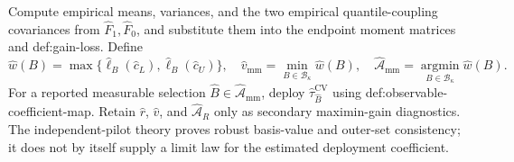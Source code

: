 Compute empirical means, variances, and the two empirical quantile-coupling covariances from \(\widehat F_1,\widehat F_0\), and substitute them into the endpoint moment matrices and def:gain-loss.  Define
\[
 \widehat w(B)=\max\{\widehat\ell_B(\widehat c_L),\widehat\ell_B(\widehat c_U)\},
 \quad
 \widehat v_{\mathrm{mm}}=\min_{B\in\mathcal B_\kappa}\widehat w(B),
 \quad
 \widehat{\mathcal A}_{\mathrm{mm}}=\operatorname*{argmin}_{B\in\mathcal B_\kappa}\widehat w(B).
\]
For a reported measurable selection \(\widehat B\in\widehat{\mathcal A}_{\mathrm{mm}}\), deploy \(\widehat\tau_{\widehat B}^{\mathrm{CV}}\) using def:observable-coefficient-map.  Retain \(\widehat r\), \(\widehat v\), and \(\widehat{\mathcal A}_R\) only as secondary maximin-gain diagnostics.  The independent-pilot theory proves robust basis-value and outer-set consistency; it does not by itself supply a limit law for the estimated deployment coefficient.